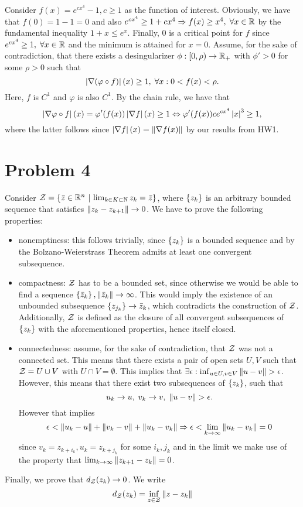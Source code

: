 \documentclass[10pt]{article}
\begin{document}
Consider $f(x) = e^{cx^4} - 1, c \geq 1$ as the function of interest. 
Obviously, we have that $f(0) = 1 - 1  = 0$ and also $e^{cx^4} \geq 1 + cx^4 
\Rightarrow f(x) \geq x^4, \; \forall x \in \mathbb{R}$ by the fundamental inequality
$1 + x \leq e^x$. Finally, $0$ is a critical point for $f$ since $e^{cx^4} \geq 
1, \; \forall x \in \mathbb{R}$ and the minimum is attained for $x = 0$. Assume, for
the sake of contradiction, that there exists a desingularizer $\phi: [0, \rho) 
\to \mathbb{R}_+$ with $\phi' > 0$ for some $\rho > 0$ such that
\[
    \left| \nabla (\varphi \circ f) \right|(x) \geq 1, \; \forall x: 0 < f(x) 
    < \rho.
\]
Here, $f$ is $C^1$ and $\varphi$ is also $C^1$. By the chain rule, we have that
\[
    \left| \nabla \varphi \circ f \right|(x) = \varphi'(f(x) )\left| \nabla f \right|(x) \geq 1
    \Leftrightarrow \varphi'(f(x)) c e^{cx^4} \left| x \right|^3 \geq 1,
\]
where the latter follows since $\left| \nabla f \right|(x) = \left \| \nabla f(x) \right \|$ by our
results from HW1.

\section*{Problem 4}
Consider $\mathcal{Z} = \left\{ \bar{z} \in \mathbb{R}^n \ \middle| \  \lim_{k \in K \subset \mathbb{N}} z_{k}
= \bar{z} \right\}$, where $\left\{ z_k \right\}$ is an arbitrary bounded sequence that satisfies
$\left \| z_k - z_{k+1} \right \| \to 0$. We have to prove the following properties:
\begin{itemize}
\item nonemptiness: this follows trivially, since $\left\{ z_k \right\}$ is a bounded
sequence and by the Bolzano-Weierstrass Theorem admits at least one convergent
subsequence.
\item compactness: $\mathcal{Z}$ has to be a bounded set, since otherwise we would be
able to find a sequence $\left\{ \bar{z}_k \right\}, \left \| \bar{z}_k \right \| \to \infty$. This
would imply the existence of an unbounded subsequence $\left\{ z_{j_k} \right\} \to
\bar{z}_k$, which contradicts the construction of $\mathcal{Z}$.
Additionally, $\mathcal{Z}$ is defined as the closure of all convergent subsequences of
$\left\{ z_k \right\}$ with the aforementioned properties, hence itself closed.
\item connectedness: assume, for the sake of contradiction, that $\mathcal{Z}$ was not
a connected set. This means that there exists a pair of open sets $U, V$ such
that $\mathcal{Z} = U \cup V$ with $U \cap V = \emptyset$. This implies that
$\exists \epsilon: \inf_{u \in U, v \in V} \left \| u - v \right \| > \epsilon$. However,
this means that there exist two subsequences of $\left\{ z_k \right\}$, such that
\[
    u_{k} \to u, \; v_{k} \to v, \; \left \| u - v \right \| > \epsilon.
\]
However that implies
\[
    \epsilon < \left \| u_k - u \right \| + \left \| v_k - v \right \| + \left \| u_k - v_k \right \| \Rightarrow
    \epsilon < \lim_{k \to \infty} \left \| u_k - v_k \right \| = 0
\]
since $v_k = z_{k + i_k}, u_k = z_{k + j_k}$ for some $i_k, j_k$ and in the 
limit we make use of the property that $\lim_{k \to \infty} \left \| z_{k+1} - 
z_k \right \| = 0$.

\end{itemize}
Finally, we prove that $d_{\mathcal{Z}}(z_k) \to 0$. We write
\[
    d_{\mathcal{Z}}(z_k) = \inf_{z \in \mathcal{Z}} \left \| z - z_k \right \|
\]
\end{document}
